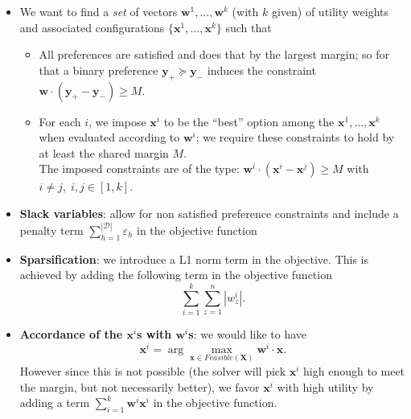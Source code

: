 \documentclass[a4paper,10pt]{article}
\newcommand{\veps}{\varepsilon}
\newcommand{\calD}{\mathcal{D}}
\newcommand{\bfx}{\mathbf{x}}
\newcommand{\bfX}{\mathbf{X}}
\newcommand{\bfy}{\mathbf{y}}
\newcommand{\bfw}{\mathbf{w}}
\newcommand{\Feas}{\mathit{Feasible}}
\begin{document}
\vspace{0.2cm} 
\begin{itemize}
 \item We want to find a {\em set} of vectors $\bfw^1, ..., \bfw^k$ (with $k$ given) of utility weights and associated configurations $\{ \bfx^1, ..., \bfx^k \}$ such that  
 \begin{itemize}
 \item All preferences are satisfied and does that by the largest margin; so for that a binary preference $\bfy_{+} \succeq \bfy_{-}$ induces the constraint $\bfw \cdot (\bfy_{+} - \bfy_{-}) \geq M$.
\item For each $i$, we impose $\bfx^i$ to be the ``best'' option among the $\bfx^1,\ldots,\bfx^k$  when evaluated according to $\bfw^i$; we require these constraints to hold by at least the shared  margin $M$.\\
The imposed constraints are of the type: $\bfw^i \cdot ( \bfx^i -  \bfx^j ) \geq M$ with $i \neq j,\; i,j \in [ 1,k ]$.
 \end{itemize}
\end{itemize}

\vspace{0.2cm} 

\begin{itemize}
 \item {\bf Slack variables}: allow for non satisfied preference constraints and include a penalty term $\sum_{h=1}^{|\calD|} \veps_{h}$ in the objective function
 \item {\bf Sparsification}: we introduce a L1 norm term in the objective.
 This is achieved by adding the following term in the objective function
 $$
 \sum_{i=1}^{k} \sum_{z=1}^{n}|w^i_{z}|.
 $$
 \item {\bf Accordance of the $\bfx^i$s with $\bfw^i$s}: we would like to have 
 $$\bfx^i = \arg \max_{\bfx \in \Feas(\bfX)} \bfw^i \cdot \bfx.$$ 
 However since this is not possible (the solver will pick $\bfx^i$ high enough to meet the margin, but not necessarily better), we favor $\bfx^i$ with high utility  by adding a term $\sum_{i=1}^{k} \bfw^i \bfx^i$ in the objective function.
\end{itemize}
\end{document}
